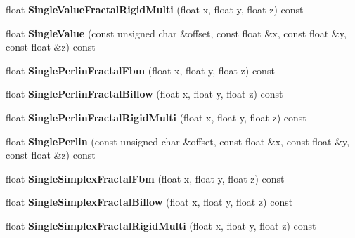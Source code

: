 \begin{DoxyCompactItemize}
\mbox{\label{class_flounder_1_1_noise_fast_ae40eb2c23416de412a38027c8b6c6e68}} 
float {\bfseries Single\+Value\+Fractal\+Rigid\+Multi} (float x, float y, float z) const
\item 
\mbox{\label{class_flounder_1_1_noise_fast_aeb6c7e60636982e520ed8d4dddf471bd}} 
float {\bfseries Single\+Value} (const unsigned char \&offset, const float \&x, const float \&y, const float \&z) const
\item 
\mbox{\label{class_flounder_1_1_noise_fast_ad1a5cd8fe6da5243df80a769be936f14}} 
float {\bfseries Single\+Perlin\+Fractal\+Fbm} (float x, float y, float z) const
\item 
\mbox{\label{class_flounder_1_1_noise_fast_a2db339d00061696e8c220553504738a1}} 
float {\bfseries Single\+Perlin\+Fractal\+Billow} (float x, float y, float z) const
\item 
\mbox{\label{class_flounder_1_1_noise_fast_a83e726dc9b6661ec1de2f288394ea166}} 
float {\bfseries Single\+Perlin\+Fractal\+Rigid\+Multi} (float x, float y, float z) const
\item 
\mbox{\label{class_flounder_1_1_noise_fast_a77fa744898d301d7cb34ecb96132d114}} 
float {\bfseries Single\+Perlin} (const unsigned char \&offset, const float \&x, const float \&y, const float \&z) const
\item 
\mbox{\label{class_flounder_1_1_noise_fast_ae0a75916604487aa4f1709ad5f869c84}} 
float {\bfseries Single\+Simplex\+Fractal\+Fbm} (float x, float y, float z) const
\item 
\mbox{\label{class_flounder_1_1_noise_fast_abbfc416d4841d294fdc13f13260a349c}} 
float {\bfseries Single\+Simplex\+Fractal\+Billow} (float x, float y, float z) const
\item 
\mbox{\label{class_flounder_1_1_noise_fast_aac50289465e60987ccfff2f2e18dcf90}} 
float {\bfseries Single\+Simplex\+Fractal\+Rigid\+Multi} (float x, float y, float z) const

\end{DoxyCompactItemize}
